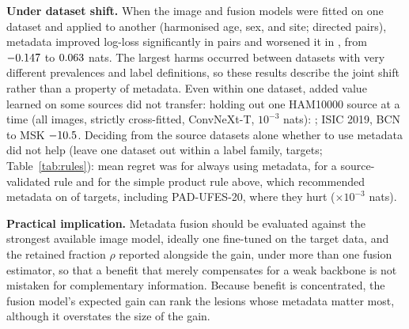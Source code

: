 \documentclass[conference]{IEEEtran}
\begin{document}
\textbf{Under dataset shift.} When the image and fusion models were fitted on one dataset and applied to another (harmonised age, sex, and site; \SHIFTn{} directed pairs), metadata improved log-loss significantly in \SHIFThelp{} pairs and worsened it in \SHIFThurt{}, from $-0.147$ to $0.063$ nats. The largest harms occurred between datasets with very different prevalences and label definitions, so these results describe the joint shift rather than a property of metadata. Even within one dataset, added value learned on some sources did not transfer: holding out one HAM10000 source at a time (all images, strictly cross-fitted, ConvNeXt-T, $10^{-3}$ nats): \SRChamText{}; ISIC 2019, BCN to MSK $-10.5$. Deciding from the source datasets alone whether to use metadata did not help (leave one dataset out within a label family, \RULESn{} targets; Table~\ref{tab:rules}): mean regret was \RULESAlways{} for always using metadata, \RULESSrc{} for a source-validated rule and \RULESColl{} for the simple product rule above, which recommended metadata on \RULESthreeUse{} of \RULESn{} targets, including PAD-UFES-20, where they hurt (\RULESpad{}$\times10^{-3}$ nats).

\textbf{Practical implication.} Metadata fusion should be evaluated against the strongest available image model, ideally one fine-tuned on the target data, and the retained fraction $\rho$ reported alongside the gain, under more than one fusion estimator, so that a benefit that merely compensates for a weak backbone is not mistaken for complementary information. Because benefit is concentrated, the fusion model's expected gain can rank the lesions whose metadata matter most, although it overstates the size of the gain.
\end{document}
